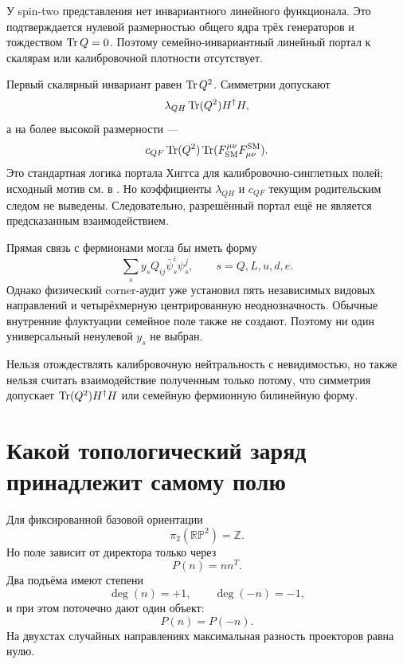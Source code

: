 У spin-two представления нет инвариантного линейного функционала. Это
подтверждается нулевой размерностью общего ядра трёх генераторов и
тождеством $\operatorname{Tr} Q=0$. Поэтому семейно-инвариантный линейный портал к
скалярам или калибровочной плотности отсутствует.

Первый скалярный инвариант равен $\operatorname{Tr} Q^2$. Симметрии допускают
\begin{equation}
 \lambda_{QH}\operatorname{Tr}(Q^2)H^\dagger H,
 \label{eq:v6-Q-Higgs-portal}
\end{equation}
а на более высокой размерности ---
\begin{equation}
 c_{QF}\operatorname{Tr}(Q^2)\operatorname{Tr}(F_{\rm SM}^{\mu\nu}F^{\rm SM}_{\mu\nu}).
\end{equation}
Это стандартная логика портала Хиггса для калибровочно-синглетных полей; исходный
мотив см. в . Но коэффициенты
$\lambda_{QH}$ и $c_{QF}$ текущим родительским следом не выведены.
Следовательно, разрешённый портал ещё не является предсказанным
взаимодействием.

Прямая связь с фермионами могла бы иметь форму
\begin{equation}
 \sum_s y_s Q_{ij}\bar\psi_s^i\psi_s^j,
 \qquad s=Q,L,u,d,e.
\end{equation}
Однако физический corner-аудит уже установил пять независимых видовых
направлений и четырёхмерную центрированную неоднозначность. Обычные
внутренние флуктуации семейное поле также не создают. Поэтому ни один
универсальный ненулевой $y_s$ не выбран.

\begin{nogocriterion}
Нельзя отождествлять калибровочную нейтральность с невидимостью, но также нельзя
считать взаимодействие полученным только потому, что симметрия допускает
$\operatorname{Tr}(Q^2)H^\dagger H$ или семейную фермионную билинейную форму.
\end{nogocriterion}

\section{Какой топологический заряд принадлежит самому полю}

Для фиксированной базовой ориентации
\begin{equation}
 \pi_2(\mathbb{RP}^2)=\mathbb Z.
\end{equation}
Но поле зависит от директора только через
\begin{equation}
 P(n)=nn^T.
\end{equation}
Два подъёма имеют степени
\begin{equation}
 \deg(n)=+1,
 \qquad
 \deg(-n)=-1,
\end{equation}
и при этом поточечно дают один объект:
\begin{equation}
 P(n)=P(-n).
\end{equation}
На двухстах случайных направлениях максимальная разность проекторов равна
нулю.

